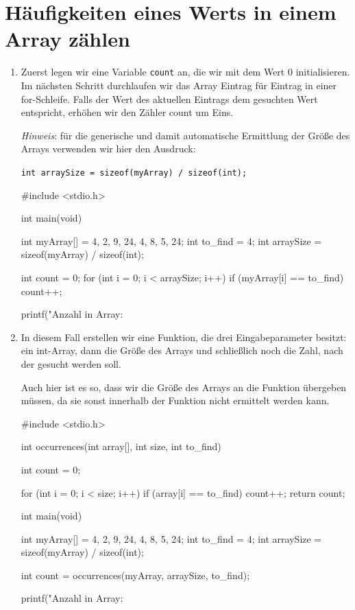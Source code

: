 \chapter{Häufigkeiten eines Werts in einem Array zählen}

\begin{enumerate}
\item Zuerst legen wir eine Variable \texttt{count} an, die wir mit dem
Wert 0 initialisieren. Im nächsten Schritt durchlaufen wir das Array Eintrag
für Eintrag in einer for-Schleife. Falls der Wert des aktuellen Eintrags dem
gesuchten Wert entspricht, erhöhen wir den Zähler count um Eins.

\textit{Hinweis}: für die generische und damit automatische Ermittlung der
Größe des Arrays verwenden wir hier den Ausdruck:

\noindent\texttt{int arraySize = sizeof(myArray) / sizeof(int);}

\begin{codebox}[lang=c, fontsize=\small]
#include <stdio.h>

int main(void) {
    int myArray[] = {4, 2, 9, 24, 4, 8, 5, 24};
    int to_find = 4;
    int arraySize = sizeof(myArray) / sizeof(int);

    int count = 0;
    for (int i = 0; i < arraySize; i++) {
        if (myArray[i] == to_find)
            count++;
    }

    printf("Anzahl in Array: %
}
\end{codebox}

\item In diesem Fall erstellen wir eine Funktion, die drei Eingabeparameter
besitzt: ein int-Array, dann die Größe des Arrays und schließlich noch die
Zahl, nach der gesucht werden soll.

Auch hier ist es so, dass wir die Größe des Arrays an die Funktion übergeben
müssen, da sie sonst innerhalb der Funktion nicht ermittelt werden kann.

\begin{codebox}[lang=c, fontsize=\small]
#include <stdio.h>

int occurrences(int array[], int size, int to_find) {
    int count = 0;

    for (int i = 0; i < size; i++) {
        if (array[i] == to_find)
            count++;
    }
    return count;
}

int main(void) {
    int myArray[] = {4, 2, 9, 24, 4, 8, 5, 24};
    int to_find = 4;
    int arraySize = sizeof(myArray) / sizeof(int);

    int count = occurrences(myArray, arraySize, to_find);

    printf("Anzahl in Array: %
}
\end{codebox}

\end{enumerate}



